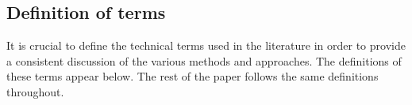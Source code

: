 \documentclass{ieeeaccess}
\begin{document}

\subsection{Definition of terms}
\label{sec:Definition}

It is crucial to define the technical terms %
used in the literature in order to provide %
a consistent discussion of the various methods and approaches. The definitions of these terms appear below. The rest of the paper follows the same definitions %
throughout.
\end{document}
